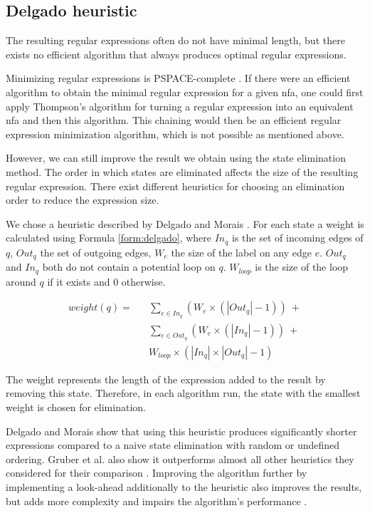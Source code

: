 \subsection{Delgado heuristic}\label{sec:delgado}

The resulting regular expressions often do not have minimal length, but there exists no efficient algorithm that always produces optimal regular expressions.

Minimizing regular expressions is PSPACE-complete \cite{minimizing_nfa}.
If there were an efficient algorithm to obtain the minimal regular expression for a given \ac{nfa}, one could first apply Thompson's algorithm \cite{thompson} for turning a regular expression into an equivalent \ac{nfa} and then this algorithm. This chaining would then be an efficient regular expression minimization algorithm, which is not possible as mentioned above.

However, we can still improve the result we obtain using the state elimination method.
The order in which states are eliminated affects the size of the resulting regular expression. There exist different heuristics for choosing an elimination order to reduce the expression size.

We chose a heuristic described by Delgado and Morais \cite{delgado}.
For each state a weight is calculated using Formula \ref{form:delgado}, where $In_q$ is the set of incoming edges of $q$, $Out_q$ the set of outgoing edges, $W_e$ the size of the label on any edge $e$. $Out_q$ and $In_q$ both do not contain a potential loop on $q$. $W_{loop}$ is the size of the loop around $q$ if it exists and $0$ otherwise. 

\begin{equation}
	\begin{aligned}
	weight(q) = &&\sum_{e \in In_q} (W_{e} \times (|Out_q| - 1))\ + \\&&\sum_{e \in Out_q} (W_{e} \times (|In_q| - 1))\ + \\&&W_{loop} \times (|In_q| \times |Out_q| - 1)
	\end{aligned}
\label{form:delgado}
\end{equation}

The weight represents the length of the expression added to the result by removing this state.
Therefore, in each algorithm run, the state with the smallest weight is chosen for elimination.

Delgado and Morais show that using this heuristic produces significantly shorter expressions compared to a naive state elimination \cite{delgado} with random or undefined ordering. Gruber et al. also show it outperforms almost all other heuristics they considered for their comparison \cite{gruber}.
Improving the algorithm further by implementing a look-ahead additionally to the heuristic also improves the results, but adds more complexity and impairs the algorithm's performance \cite{delgado}.


